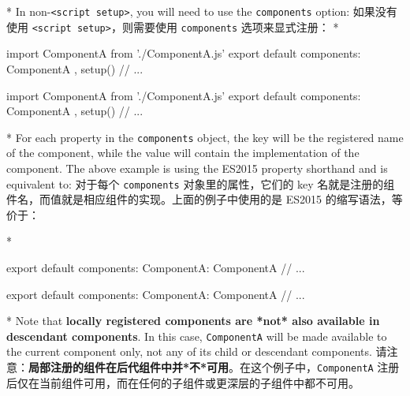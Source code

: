 \begin{paracol}{2}
\switchcolumn[0]*%
In non-\texttt{\textless{}script\ setup\textgreater{}}, you will need to
use the \texttt{components} option:
\switchcolumn
如果没有使用 \texttt{\textless{}script\ setup\textgreater{}}，则需要使用
\texttt{components} 选项来显式注册：
\switchcolumn[0]*%
\begin{codeJs}
import ComponentA from './ComponentA.js'
export default {
  components: {
    ComponentA
  },
  setup() {
    // ...
  }
}
\end{codeJs}
\switchcolumn
\begin{codeJs}
import ComponentA from './ComponentA.js'
export default {
  components: {
    ComponentA
  },
  setup() {
    // ...
  }
}
\end{codeJs}
\switchcolumn[0]*%
For each property in the \texttt{components} object, the key will be the
registered name of the component, while the value will contain the
implementation of the component. The above example is using the ES2015
property shorthand and is equivalent to:
\switchcolumn
对于每个 \texttt{components} 对象里的属性，它们的 key
名就是注册的组件名，而值就是相应组件的实现。上面的例子中使用的是 ES2015
的缩写语法，等价于：


\switchcolumn[0]*%
\begin{codeJs}
export default {
  components: {
    ComponentA: ComponentA
  }
  // ...
}
\end{codeJs}
\switchcolumn
\begin{codeJs}
export default {
  components: {
    ComponentA: ComponentA
  }
  // ...
}
\end{codeJs}
\switchcolumn[0]*%
Note that \textbf{locally registered components are *not* also available
in descendant components}. In this case, \texttt{ComponentA} will be
made available to the current component only, not any of its child or
descendant components.
\switchcolumn
请注意：\textbf{局部注册的组件在后代组件中并*不*可用}。在这个例子中，\texttt{ComponentA}
注册后仅在当前组件可用，而在任何的子组件或更深层的子组件中都不可用。
\end{paracol}

